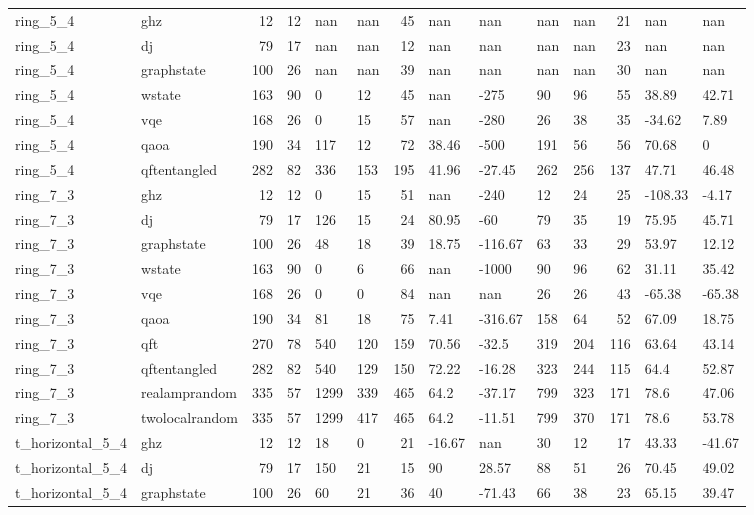 \begin{longtable}{llrrllrllllrll}
ring\_5\_4 & ghz & 12 & 12 & nan & nan & 45 & nan & nan & nan & nan & 21 & nan & nan \\
ring\_5\_4 & dj & 79 & 17 & nan & nan & 12 & nan & nan & nan & nan & 23 & nan & nan \\
ring\_5\_4 & graphstate & 100 & 26 & nan & nan & 39 & nan & nan & nan & nan & 30 & nan & nan \\
ring\_5\_4 & wstate & 163 & 90 & 0 & 12 & 45 & nan & -275 & 90 & 96 & 55 & 38.89 & 42.71 \\
ring\_5\_4 & vqe & 168 & 26 & 0 & 15 & 57 & nan & -280 & 26 & 38 & 35 & -34.62 & 7.89 \\
ring\_5\_4 & qaoa & 190 & 34 & 117 & 12 & 72 & 38.46 & -500 & 191 & 56 & 56 & 70.68 & 0 \\
ring\_5\_4 & qftentangled & 282 & 82 & 336 & 153 & 195 & 41.96 & -27.45 & 262 & 256 & 137 & 47.71 & 46.48 \\
ring\_7\_3 & ghz & 12 & 12 & 0 & 15 & 51 & nan & -240 & 12 & 24 & 25 & -108.33 & -4.17 \\
ring\_7\_3 & dj & 79 & 17 & 126 & 15 & 24 & 80.95 & -60 & 79 & 35 & 19 & 75.95 & 45.71 \\
ring\_7\_3 & graphstate & 100 & 26 & 48 & 18 & 39 & 18.75 & -116.67 & 63 & 33 & 29 & 53.97 & 12.12 \\
ring\_7\_3 & wstate & 163 & 90 & 0 & 6 & 66 & nan & -1000 & 90 & 96 & 62 & 31.11 & 35.42 \\
ring\_7\_3 & vqe & 168 & 26 & 0 & 0 & 84 & nan & nan & 26 & 26 & 43 & -65.38 & -65.38 \\
ring\_7\_3 & qaoa & 190 & 34 & 81 & 18 & 75 & 7.41 & -316.67 & 158 & 64 & 52 & 67.09 & 18.75 \\
ring\_7\_3 & qft & 270 & 78 & 540 & 120 & 159 & 70.56 & -32.5 & 319 & 204 & 116 & 63.64 & 43.14 \\
ring\_7\_3 & qftentangled & 282 & 82 & 540 & 129 & 150 & 72.22 & -16.28 & 323 & 244 & 115 & 64.4 & 52.87 \\
ring\_7\_3 & realamprandom & 335 & 57 & 1299 & 339 & 465 & 64.2 & -37.17 & 799 & 323 & 171 & 78.6 & 47.06 \\
ring\_7\_3 & twolocalrandom & 335 & 57 & 1299 & 417 & 465 & 64.2 & -11.51 & 799 & 370 & 171 & 78.6 & 53.78 \\
t\_horizontal\_5\_4 & ghz & 12 & 12 & 18 & 0 & 21 & -16.67 & nan & 30 & 12 & 17 & 43.33 & -41.67 \\
t\_horizontal\_5\_4 & dj & 79 & 17 & 150 & 21 & 15 & 90 & 28.57 & 88 & 51 & 26 & 70.45 & 49.02 \\
t\_horizontal\_5\_4 & graphstate & 100 & 26 & 60 & 21 & 36 & 40 & -71.43 & 66 & 38 & 23 & 65.15 & 39.47 \\

\end{longtable}
